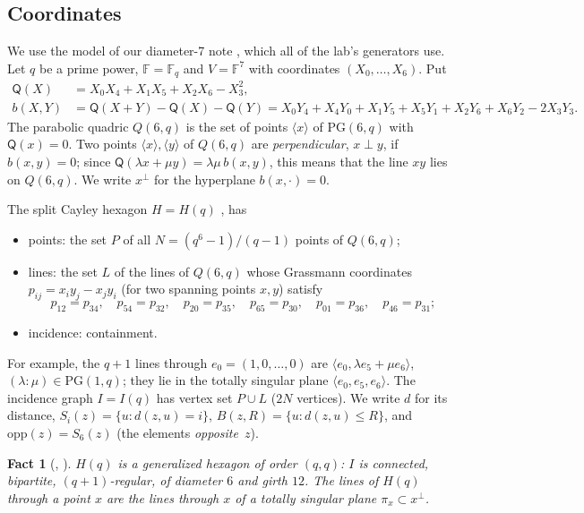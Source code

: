 \documentclass[11pt]{amsart}
\theoremstyle{plain}
\newtheorem{fact}[lemma]{Fact}
\theoremstyle{definition}
\theoremstyle{remark}
\newcommand{\F}{\mathbb{F}}
\newcommand{\PG}{\mathrm{PG}}
\newcommand{\Q}{\mathsf{Q}}
\newcommand{\opp}{\mathrm{opp}}
\newcommand{\ip}{\perp}
\newcommand{\pP}{P}  %
\newcommand{\lL}{L}  %
\begin{document}
\subsection{Coordinates}
We use the model of our diameter-7 note \cite[\S1.1]{OD7}, which all of the lab's generators use. Let $q$ be a prime
power, $\F = \F_q$ and $V = \F^7$ with coordinates $(X_0, \dots, X_6)$. Put
\begin{align*}
\Q(X) &= X_0X_4 + X_1X_5 + X_2X_6 - X_3^2,\\
b(X,Y) &= \Q(X+Y) - \Q(X) - \Q(Y) = X_0Y_4 + X_4Y_0 + X_1Y_5 + X_5Y_1 + X_2Y_6 + X_6Y_2 - 2X_3Y_3 .
\end{align*}
The parabolic quadric $Q(6,q)$ is the set of points $\langle x\rangle$ of $\PG(6,q)$ with $\Q(x) = 0$. Two points
$\langle x\rangle, \langle y\rangle$ of $Q(6,q)$ are \emph{perpendicular}, $x \ip y$, if $b(x,y) = 0$; since
$\Q(\lambda x + \mu y) = \lambda\mu\, b(x,y)$, this means that the line $xy$ lies on $Q(6,q)$. We write $x^\perp$ for
the hyperplane $b(x,\cdot) = 0$.

The split Cayley hexagon $H = H(q)$ \cite{Ti59}, \cite[\S2.4]{VM98} has
\begin{itemize}[leftmargin=1.5em]
\item points: the set $\pP$ of all $N = (q^6-1)/(q-1)$ points of $Q(6,q)$;
\item lines: the set $\lL$ of the lines of $Q(6,q)$ whose Grassmann coordinates $p_{ij} = x_iy_j - x_jy_i$ (for two
  spanning points $x, y$) satisfy
  \[ p_{12} = p_{34},\quad p_{54} = p_{32},\quad p_{20} = p_{35},\quad p_{65} = p_{30},\quad p_{01} = p_{36},\quad p_{46} = p_{31}; \]
\item incidence: containment.
\end{itemize}
For example, the $q+1$ lines through $e_0 = (1,0,\dots,0)$ are $\langle e_0, \lambda e_5 + \mu e_6\rangle$,
$(\lambda:\mu) \in \PG(1,q)$; they lie in the totally singular plane $\langle e_0, e_5, e_6\rangle$. The incidence graph
$I = I(q)$ has vertex set $\pP \cup \lL$ ($2N$ vertices). We write $d$ for its distance,
$S_i(z) = \{u : d(z,u) = i\}$, $B(z,R) = \{u : d(z,u) \le R\}$, and $\opp(z) = S_6(z)$ (the elements \emph{opposite}~$z$).

\begin{fact}[{\cite{Ti59}, \cite[\S2.4]{VM98}}]\label{fact:gh}
$H(q)$ is a generalized hexagon of order $(q,q)$: $I$ is connected, bipartite, $(q+1)$-regular, of diameter $6$ and
girth $12$. The lines of $H(q)$ through a point $x$ are the lines through $x$ of a totally singular plane
$\pi_x \subset x^\perp$.
\end{fact}
\end{document}
